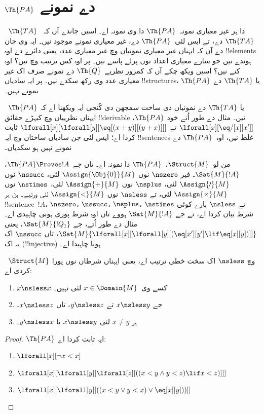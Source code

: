 \documentclass[../../../include/open-logic-section]{subfiles}
\begin{document}
\section{$\Th{PA}$ دے نمونے}

\begin{explain}
~$\Th{TA}$ دا ہر غیر معیاری نمونہ~$\Th{PA}$ دا وی نمونہ اے۔
اسیں جاندے آں کہ~$\Th{TA}$ دے، تے ایس لئی~$\Th{PA}$ دے،
غیر معیاری نمونے موجود نیں۔ ایہ وی جان دے آں کہ ایہناں
غیر معیاری نمونیاں وچ غیر معیاری عدد، یعنی دائرے دے
اوہ !!{element}s ہوندے نیں جو سارے معیاری اعداد توں
پرلے پاسے نیں۔ پر اوہ کس ترتیب وچ نیں؟ اوہ کنے نیں؟
اسیں ویکھ چکے آں کہ کمزور نظریے~$\Th{Q}$ دے نمونے
صرف اک غیر معیاری عدد وی رکھ سکدے نیں۔ پر ایہ سادیاں
!!{structure}s، $\Th{PA}$ یا $\Th{TA}$ دے نمونے نہیں۔

~$\Th{PA}$ یا $\Th{TA}$ دے نمونیاں دی ساخت سمجھن دی
کُنجی ایہ ویکھنا اے کہ ایہناں نظرییاں وچ کیہڑے حقائق
!!{derivable} نیں۔ مثال دے طور اُتے خود $\Th{PA}$،
$\lforall[x][\eq/[x][x']]$ تے
$\lforall[x][\lforall[y][\eq[(x+y)][(y+x)]]]$
ثابت کردا اے؛ ایس لئی جن سادیاں ساختاں وچ ایہ
!!{sentence}s غلط نیں، اوہ~$\Th{PA}$ دے نمونے نہیں ہو سکدیاں۔

من لو~$\Struct{M}$،~$\Th{PA}$ دا نمونہ اے۔ تاں جے
$\Th{PA} \Proves !A$، $\Sat{M}{!A}$۔ فیر
$\nszero$ نوں $\Assign{\Obj{0}}{M}$ لئی،
$\nssucc$ نوں $\Assign{\prime}{M}$ لئی،
$\nsplus$ نوں $\Assign{+}{M}$ لئی،
$\nstimes$ نوں $\Assign{\times}{M}$ لئی، تے
$\nsless$ نوں $\Assign{<}{M}$ لئی ورتیے۔
ہن ہر !!{sentence}~$!A$، $\nszero$، $\nssucc$،
$\nsplus$، $\nstimes$ تے $\nsless$ بارے کوئی شرط بیان
کردا اے، تے جے $\Sat{M}{!A}$ ہووے تاں اوہ شرط پوری
ہونی چاہیدی اے۔ مثال دے طور اُتے، جے $\Sat{M}{!Q_1}$،
یعنی
$\Sat{M}{\lforall[x][\lforall[y][(\eq[x'][y'] \lif \eq[x][y])]]}$،
تاں $\nssucc$ اک بہ اک (!!{injective}) ہونا چاہیدا اے۔
\end{explain}

\begin{prop}
~$\Struct{M}$ وچ $\nsless$ اک سخت خطی ترتیب اے، یعنی ایہناں
شرطاں نوں پورا کردی اے:
\begin{enumerate}
\item $x \nsless x$ کسے وی~$x \in \Domain{M}$ لئی نہیں۔
\item جے $x \nsless y$ تے $y \nsless z$، تاں $x \nsless z$۔
\item ہر $x \neq y$ لئی $x \nsless y$ یا $y \nsless x$۔
\end{enumerate}
\end{prop}

\begin{proof}
$\Th{PA}$ ایہ ثابت کردا اے:
\begin{enumerate}
\item $\lforall[x][\lnot x < x]$
\item $\lforall[x][\lforall[y][\lforall[z][((x < y \land y < z) \lif x < z)]]]$
\item $\lforall[x][\lforall[y][((x < y \lor y < x) \lor \eq[x][y]))]]$
\end{enumerate}
\end{proof}
\end{document}
